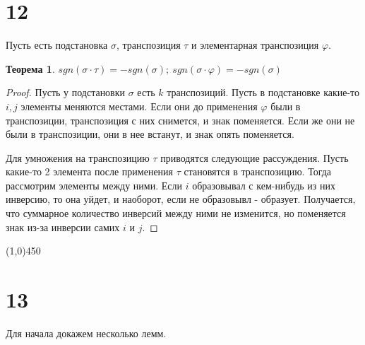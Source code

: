 \documentclass[a4paper,12pt]{article}
\newtheorem*{ther}{Теорема}
\renewcommand{\phi}{\varphi}
\begin{document}
	\section*{12}
	Пусть есть подстановка $\sigma$, транспозиция $\tau$ и элементарная транспозиция $\phi$.
	\begin{ther}
		$sgn(\sigma \cdot \tau) = -sgn(\sigma); \ sgn(\sigma \cdot \phi) = -sgn(\sigma)$
	\end{ther}
	
	\begin{proof}
		Пусть у подстановки $\sigma$ есть $k$ транспозиций.	Пусть в подстановке какие-то $i, j$ элементы меняются местами. Если они до применения $\phi$ были в транспозиции, транспозиция с них снимется, и знак поменяется. Если же они не были в транспозиции, они в нее встанут, и знак опять поменяется.
		
		Для умножения на транспозицию $\tau$ приводятся следующие рассуждения. Пусть какие-то 2 элемента после применения $\tau$ становятся в транспозицию. Тогда рассмотрим элементы между ними. Если $i$ образовывал с кем-нибудь из них инверсию, то она уйдет, и наоборот, если не образовывл - образует. Получается, что суммарное количество инверсий между ними не изменится, но поменяется знак из-за инверсии самих $i$ и $j$.
	\end{proof}

	\begin{center}
		\line(1,0){450}
	\end{center}

	\section*{13}
	Для начала докажем несколько лемм.
	
\end{document}
